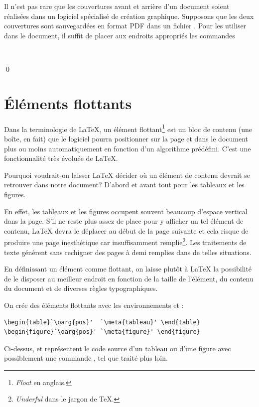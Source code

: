 \begin{exemple}
  Il n'est pas rare que les couvertures avant et arrière d'un document
  soient réalisées dans un logiciel spécialisé de création graphique.
  Supposons que les deux couvertures sont sauvegardées en format PDF
  dans un fichier . Pour les utiliser dans le
  document, il suffit de placer aux endroits appropriés les commandes
\begin{lstlisting}


\end{lstlisting}
  \qed
\end{exemple}



\section{Éléments flottants}
\label{sec:tableaux:floats}

Dans la terminologie de {\LaTeX}, un élément flottant\footnote{%
  \emph{Float} en anglais.} %
est un bloc de contenu (une boîte, en fait) que le logiciel pourra
positionner sur la page et dans le document plus ou moins
automatiquement en fonction d'un algorithme prédéfini. C'est une
fonctionnalité très évoluée de {\LaTeX}.

Pourquoi voudrait-on laisser {\LaTeX} décider où un élément de contenu
devrait se retrouver dans notre document? D'abord et avant tout pour
les tableaux et les figures.

En effet, les tableaux et les figures occupent souvent beaucoup
d'espace vertical dans la page. S'il ne reste plus assez de place pour
y afficher un tel élément de contenu, {\LaTeX} devra le déplacer au
début de la page suivante et cela risque de produire une page
inesthétique car insuffisamment remplie\footnote{%
  \emph{Underful } dans le jargon de {\TeX}.}. %
Les traitements de texte génèrent sans rechigner des pages à demi
remplies dans de telles situations.

En définissant un élément comme flottant, on laisse plutôt à
{\LaTeX} la possibilité de le disposer au meilleur endroit en fonction
de la taille de l'élément, du contenu du document et de diverses
règles typographiques.

On crée des éléments flottants avec les environnements 
et :
\begin{lstlisting}
\begin{table}`\oarg{pos}'  `\meta{tableau}' \end{table}
\begin{figure}`\oarg{pos}' `\meta{figure}' \end{figure}
\end{lstlisting}
Ci-dessus,  et  représentent le code source
d'un tableau ou d'une figure avec possiblement une commande
, tel que traité plus loin.

